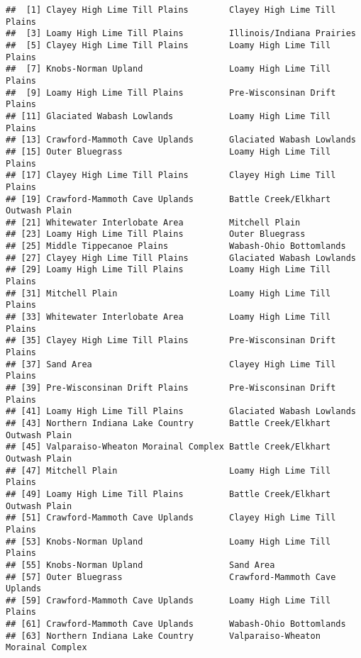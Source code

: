\documentclass[
]{article}
\begin{document}
\begin{verbatim}
##  [1] Clayey High Lime Till Plains        Clayey High Lime Till Plains       
##  [3] Loamy High Lime Till Plains         Illinois/Indiana Prairies          
##  [5] Clayey High Lime Till Plains        Loamy High Lime Till Plains        
##  [7] Knobs-Norman Upland                 Loamy High Lime Till Plains        
##  [9] Loamy High Lime Till Plains         Pre-Wisconsinan Drift Plains       
## [11] Glaciated Wabash Lowlands           Loamy High Lime Till Plains        
## [13] Crawford-Mammoth Cave Uplands       Glaciated Wabash Lowlands          
## [15] Outer Bluegrass                     Loamy High Lime Till Plains        
## [17] Clayey High Lime Till Plains        Clayey High Lime Till Plains       
## [19] Crawford-Mammoth Cave Uplands       Battle Creek/Elkhart Outwash Plain 
## [21] Whitewater Interlobate Area         Mitchell Plain                     
## [23] Loamy High Lime Till Plains         Outer Bluegrass                    
## [25] Middle Tippecanoe Plains            Wabash-Ohio Bottomlands            
## [27] Clayey High Lime Till Plains        Glaciated Wabash Lowlands          
## [29] Loamy High Lime Till Plains         Loamy High Lime Till Plains        
## [31] Mitchell Plain                      Loamy High Lime Till Plains        
## [33] Whitewater Interlobate Area         Loamy High Lime Till Plains        
## [35] Clayey High Lime Till Plains        Pre-Wisconsinan Drift Plains       
## [37] Sand Area                           Clayey High Lime Till Plains       
## [39] Pre-Wisconsinan Drift Plains        Pre-Wisconsinan Drift Plains       
## [41] Loamy High Lime Till Plains         Glaciated Wabash Lowlands          
## [43] Northern Indiana Lake Country       Battle Creek/Elkhart Outwash Plain 
## [45] Valparaiso-Wheaton Morainal Complex Battle Creek/Elkhart Outwash Plain 
## [47] Mitchell Plain                      Loamy High Lime Till Plains        
## [49] Loamy High Lime Till Plains         Battle Creek/Elkhart Outwash Plain 
## [51] Crawford-Mammoth Cave Uplands       Clayey High Lime Till Plains       
## [53] Knobs-Norman Upland                 Loamy High Lime Till Plains        
## [55] Knobs-Norman Upland                 Sand Area                          
## [57] Outer Bluegrass                     Crawford-Mammoth Cave Uplands      
## [59] Crawford-Mammoth Cave Uplands       Loamy High Lime Till Plains        
## [61] Crawford-Mammoth Cave Uplands       Wabash-Ohio Bottomlands            
## [63] Northern Indiana Lake Country       Valparaiso-Wheaton Morainal Complex

\end{verbatim}
\end{document}
